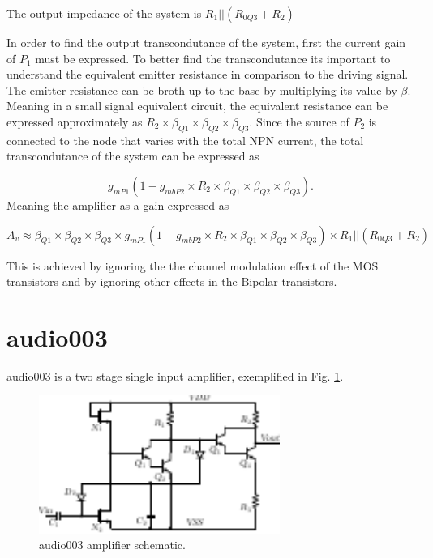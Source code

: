 \documentclass[12pt]{article}
\begin{document}
 The output impedance of the system is $R_1 || (R_{0Q3}+R_2)$

 In order to find the output transcondutance of the system, first the current gain of $P_1$ must be expressed.
 To better find the transcondutance its important to understand the equivalent emitter resistance in comparison to the driving signal. The emitter resistance can be broth up to the base by multiplying its value by $\beta$. Meaning in a small signal equivalent circuit, the equivalent resistance can be expressed approximately as $R_2 \times \beta_{Q1} \times \beta_{Q2} \times \beta_{Q3}$. Since the source of $P_2$ is connected to the node that varies with the total NPN current, the total transcondutance of the system can be expressed as
 
 \begin{equation}
     g_{mP1} (1 - g_{mbP2} \times R_2 \times \beta_{Q1} \times \beta_{Q2} \times \beta_{Q3} ) .
 \end{equation}
Meaning the amplifier as a gain expressed as

\begin{equation}
    A_v \approx          \beta_{Q1} \times \beta_{Q2} \times \beta_{Q3} \times g_{mP1} (1 - g_{mbP2} \times R_2 \times \beta_{Q1} \times \beta_{Q2} \times \beta_{Q3}) \times R_1 || (R_{0Q3}+R_2)
\end{equation}

This is achieved by ignoring the the channel modulation effect of the MOS transistors and by ignoring other effects in the Bipolar transistors.







\newpage



\section{audio003}

audio003 is a  two stage single input amplifier, exemplified in Fig. \ref{audio003}.
\begin{figure}[H]
        \centering
        \includegraphics[width=0.7\textwidth]{audio003.pdf}
        \caption{audio003 amplifier schematic.}
        \label{audio003}
\end{figure}
\end{document}
